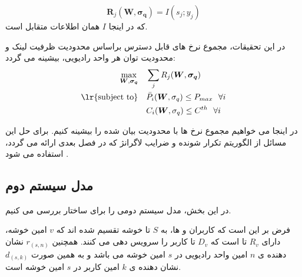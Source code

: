 \begin{equation}
\boldsymbol{R}_j (\boldsymbol{W},\boldsymbol{\sigma_q})=I(s_j;y_j) 
\end{equation}
که در اینجا 
$I$
همان اطلاعات متقابل است.


 در این تحقیقات، مجموع نرخ های قابل دسترس براساس محدودیت ظرفیت لینک  و محدودیت توان هر واحد رادیویی، بیشینه می گردد:
\begin{equation}
\begin{aligned}
\max\limits_{\boldsymbol{W},\boldsymbol{\sigma_q}}   \quad &   \sum_j R_j(\boldsymbol{W},\boldsymbol{\sigma_q})\\
\text{\lr{subject to}} \quad  & \bar{P}_i(\boldsymbol{W}, \sigma_q) \leq P_{max} \ \  \forall i \\
&C_i(\boldsymbol{W},\sigma_q)\leq C^{th}  \ \ \forall i \\
\end{aligned}
\end{equation}

 
در اینجا می خواهیم مجموع نرخ ها با محدودیت بیان شده را بیشینه کنیم. برای حل این مسائل از الگوریتم تکرار شونده و ضرایب لاگرانژ که در فصل بعدی ارائه می گردد، استفاده می شود \cite{ul_dl,ulSimeone, Fronthaul, precodSimeone}.

\subsection{مدل سیستم دوم}
در این بخش، مدل سیستم دومی را برای ساختار  بررسی می کنیم. 


فرض بر این است که کاربران و ها، به 
 $S$
 تا خوشه تقسیم شده اند که $v$ امین خوشه،
 دارای $R_v$ تا  است که ${D}_v$ تا کاربر را سرویس دهی می کنند.
همچنین  $r_{(s,n)}$
 نشان دهنده ی $n$ امین واحد رادیویی در $s$ امین خوشه می باشد  و به همین صورت $d_{(s,k)}$
 نشان دهنده ی $k$ امین کاربر در $s$ امین خوشه است.

